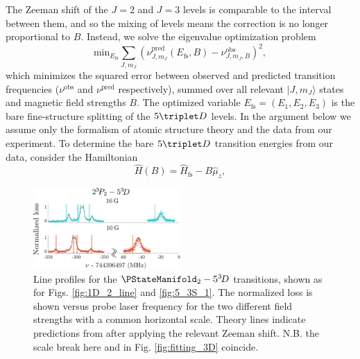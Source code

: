 The Zeeman shift of the $J=2$ and $J=3$ levels is comparable to the interval between them, and so the mixing of levels means the correction is no longer proportional to $B$. Instead, we solve the eigenvalue optimization problem 
%
\begin{equation}
\textrm{min}_{E_{\textrm{fs}}} \sum_{J,m_J} \left(\nu_{{J,m_J}}^{\textrm{{pred}}}(E_{\textrm{fs}},B) - \nu_{{J,m_J,B}}^{\textrm{{obs}}}\right)^2,
\label{eqn:opt-problem}
\end{equation}
%
which minimizes the squared error between observed and predicted transition frequencies ($\nu^{\textrm{{obs}}}$ and $\nu^{{\textrm{pred}}}$ respectively), summed over all relevant $|J,m_J\rangle$ states and magnetic field strengths $B$. The optimized variable $E_{\textrm{fs}}=(E_1,E_2,E_3)$ is the bare fine-structure splitting of the $5\triplet D$ levels. In the argument below we assume only the formalism of atomic structure theory and the data from our experiment. To determine the bare $5\triplet D$ transition energies from our data, consider the Hamiltonian
%
\begin{equation}
    \hat{H}(B) = \hat{H}_{\textrm{fs}} - B\hat{\mu}_z,
    \label{eqn:hamiltonian}
\end{equation}
%

\begin{figure}[t]
  \includegraphics[width=0.5\textwidth]{fig/spectroscopy/ci-plot-53D-eps-converted-to.pdf}
  \caption{Line profiles for the $\PStateManifold_2 -  5^{3\!}D$ transitions, shown as for Figs. \ref{fig:1D_2_line} and \ref{fig:5_3S_1}. The normalized loss is shown versus probe laser frequency for the two different field strengths with a common horizontal scale. Theory lines indicate predictions from \cite{Drake07} after applying the relevant Zeeman shift. N.B. the scale break here and in Fig. \ref{fig:fitting_3D} coincide.}
  \label{fig:combined_5D_lines}
\end{figure}

